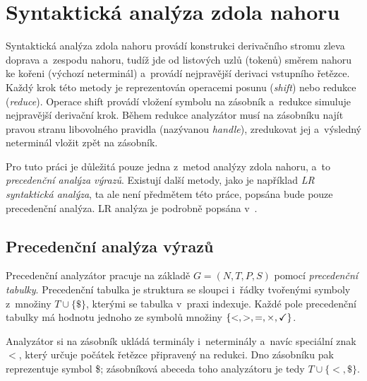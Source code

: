 \section{Syntaktická analýza zdola nahoru}\label{kap_sa_zdola_nahoru}
Syntaktická analýza zdola nahoru provádí konstrukci derivačního stromu zleva doprava a~zespodu nahoru, tudíž jde od listových uzlů (tokenů) směrem nahoru ke kořeni (výchozí neterminál) a~provádí nejpravější derivaci vstupního řetězce.
Každý krok této metody je reprezentován operacemi posunu (\emph{shift}) nebo redukce (\emph{reduce}).
Operace shift provádí vložení symbolu na zásobník a~redukce simuluje nejpravější derivační krok.
Během redukce analyzátor musí na zásobníku najít pravou stranu libovolného pravidla (nazývanou \emph{handle}), zredukovat jej a~výsledný neterminál vložit zpět na zásobník.

Pro tuto práci je důležitá pouze jedna z~metod analýzy zdola nahoru, a~to \emph{precedenční analýza výrazů}.
Existují další metody, jako je například \emph{LR syntaktická analýza}, ta ale není předmětem této práce, popsána bude pouze precedenční analýza.
LR analýza je podrobně popsána v~\cite{medunaElementsOfCompDesign}.

\subsection*{Precedenční analýza výrazů}
Precedenční analyzátor pracuje na základě $G = (N, T, P, S)$ pomocí \emph{precedenční tabulky}.
Precedenční tabulka je struktura se sloupci i~řádky tvořenými symboly z~množiny $T \cup \{\$\}$, kterými se tabulka v~praxi indexuje.
Každé pole precedenční tabulky má hodnotu jednoho ze symbolů množiny $\{<, >, =, \times, \text{\checkmark}\}$.

Analyzátor si na zásobník ukládá terminály i~neterminály a~navíc speciální znak $<$, který určuje počátek řetězce připravený na redukci.
Dno zásobníku pak reprezentuje symbol \$; zásobníková abeceda toho analyzátoru je tedy $T \cup \{<, \$\}$.

